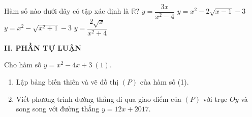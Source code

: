 \begin{ex}%
Hàm số nào dưới đây có tập xác định là $\mathbb{R}$?
\choice
{$y=\dfrac{3x}{x^2-4}$}
{$y=x^2-2\sqrt{x-1}-3$}
{\True $y=x^2-\sqrt{x^2+1}-3$}
{$y=\dfrac{2\sqrt{x}}{x^2+4}$}
\end{ex}
\noindent\textbf{II. PHẦN TỰ LUẬN}
\begin{bt}%
Cho hàm số $y=x^2-4x+3~(1)$.
\begin{enumerate}
\item Lập bảng biến thiên và vẽ đồ thị $(P)$ của hàm số (1).
\item Viết phương trình đường thẳng đi qua giao điểm của $(P)$ với trục $Oy$ và song song với đường thẳng $y=12x+2017$.
\end{enumerate}
\end{bt}
